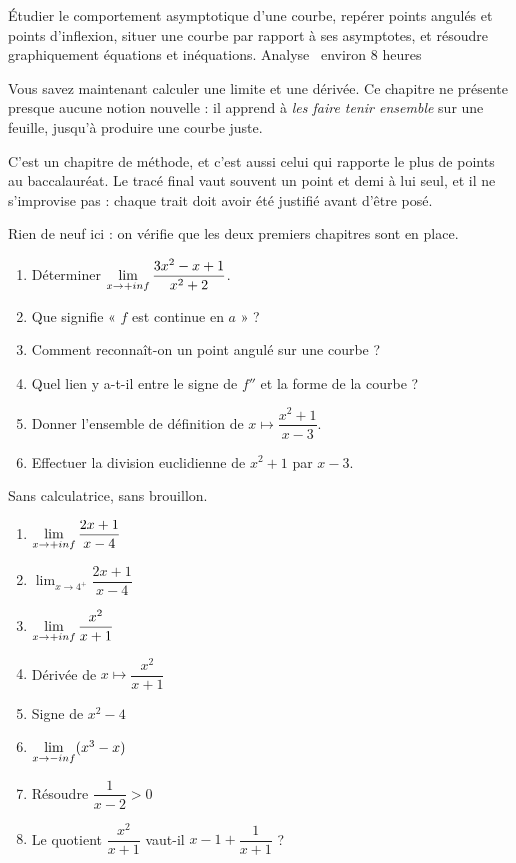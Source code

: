   {Étudier le comportement asymptotique d'une courbe, repérer points angulés et
   points d'inflexion, situer une courbe par rapport à ses asymptotes, et
   résoudre graphiquement équations et inéquations.}
  {Analyse \textbullet\ environ 8 heures}

Vous savez maintenant calculer une limite et une dérivée. Ce chapitre ne
présente presque aucune notion nouvelle : il apprend à \emph{les faire tenir
ensemble} sur une feuille, jusqu'à produire une courbe juste.

C'est un chapitre de méthode, et c'est aussi celui qui rapporte le plus de
points au baccalauréat. Le tracé final vaut souvent un point et demi à lui
seul, et il ne s'improvise pas : chaque trait doit avoir été justifié avant
d'être posé.

\begin{revision}
Rien de neuf ici : on vérifie que les deux premiers chapitres sont en place.

\begin{enumerate}[label=\textbf{\arabic*.}, leftmargin=*, itemsep=0.35em]
  \item Déterminer $\limpinf \dfrac{3x^{2}-x+1}{x^{2}+2}$.
  \item Que signifie « $f$ est continue en $a$ » ?
  \item Comment reconnaît-on un point angulé sur une courbe ?
  \item Quel lien y a-t-il entre le signe de $f''$ et la forme de la courbe ?
  \item Donner l'ensemble de définition de $x \mapsto \dfrac{x^{2}+1}{x-3}$.
  \item Effectuer la division euclidienne de $x^{2}+1$ par $x-3$.
\end{enumerate}
\end{revision}

\begin{automatismes}
Sans calculatrice, sans brouillon.

\begin{enumerate}[label=\textbf{\alph*)}, leftmargin=*, itemsep=0.25em]
  \item $\limpinf \dfrac{2x+1}{x-4}$
  \item $\displaystyle\lim_{x \to 4^{+}} \dfrac{2x+1}{x-4}$
  \item $\limpinf \dfrac{x^{2}}{x+1}$
  \item Dérivée de $x \mapsto \dfrac{x^{2}}{x+1}$
  \item Signe de $x^{2}-4$
  \item $\limminf (x^{3}-x)$
  \item Résoudre $\dfrac{1}{x-2} > 0$
  \item Le quotient $\dfrac{x^{2}}{x+1}$ vaut-il $x-1+\dfrac{1}{x+1}$ ?
\end{enumerate}
\end{automatismes}

